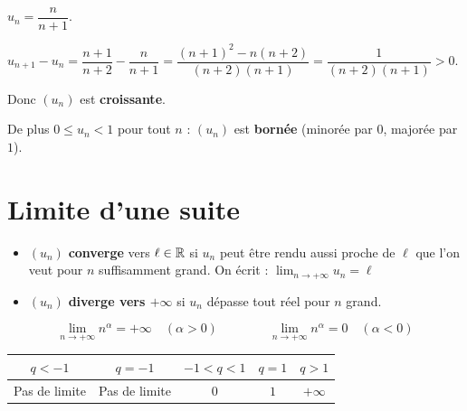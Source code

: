 \begin{exemple}
  $u_n = \dfrac{n}{n+1}$.

  \medskip
  $u_{n+1} - u_n
  = \dfrac{n+1}{n+2} - \dfrac{n}{n+1}
  = \dfrac{(n+1)^2 - n(n+2)}{(n+2)(n+1)}
  = \dfrac{1}{(n+2)(n+1)} > 0$.

  Donc $(u_n)$ est \textbf{croissante}.

  De plus $0 \leq u_n < 1$ pour tout $n$ :
  $(u_n)$ est \textbf{born\'{e}e} (minor\'{e}e par $0$, major\'{e}e par $1$).
\end{exemple}

\section{Limite d'une suite}

\begin{definition}
  \begin{itemize}
    \item $(u_n)$ \textbf{converge} vers $\ell \in \mathbb{R}$ si $u_n$
          peut \^{e}tre rendu aussi proche de $\ell$ que l'on veut
          pour $n$ suffisamment grand. On \'{e}crit :
          $\displaystyle\lim_{n \to +\infty} u_n = \ell$
    \item $(u_n)$ \textbf{diverge vers $+\infty$} si $u_n$ d\'{e}passe
          tout r\'{e}el pour $n$ grand.
  \end{itemize}
\end{definition}

\begin{propriete}
  \[
    \lim_{n \to +\infty} n^\alpha = +\infty \quad (\alpha > 0)
    \qquad\qquad
    \lim_{n \to +\infty} n^\alpha = 0 \quad (\alpha < 0)
  \]
\end{propriete}

\begin{propriete}
  \bigskip
  \begin{center}
  \renewcommand{\arraystretch}{1.8}
  \begin{tabular}{|c|c|c|c|c|}
    \hline
    \textbf{\color{navy}$q < -1$}
      & \textbf{\color{navy}$q = -1$}
      & \textbf{\color{navy}$-1 < q < 1$}
      & \textbf{\color{navy}$q = 1$}
      & \textbf{\color{navy}$q > 1$} \\
    \hline\hline
    Pas de limite & Pas de limite & $0$ & $1$ & $+\infty$ \\
    \hline
  \end{tabular}
  \end{center}
\end{propriete}

